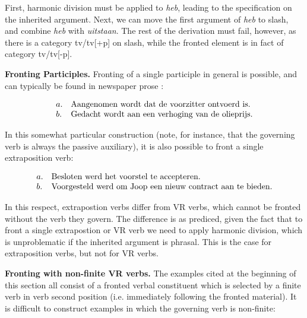 \noindent First, harmonic division must be applied to {\em heb}, leading to the
specification {\sc [+phrase]} on the inherited argument.  Next, we can move the
first argument of {\em heb} to {\sc slash}, and combine {\em heb} with {\em
uitstaan}.  The rest of the derivation must fail, however, as there is a
category {\sc tv/tv[+p]} on {\sc slash}, while the fronted element is in fact of
category {\sc tv/tv[-p]}.

{\bf Fronting Participles.}
Fronting of a single participle in general is possible, and can typically 
be found in newspaper prose \cite{ans}:

\begin{equation}
\begin{array}[t]{ll@{\hspace{0cm}}l}
a. && \mbox{Aangenomen wordt dat de voorzitter ontvoerd is.} \\
b. && \mbox{Gedacht wordt aan een verhoging van de olieprijs.} \\
\end{array} 
\end{equation}

\noindent In this somewhat particular construction (note, for instance, that the 
governing verb is always the passive auxiliary), it is also possible to front a 
single extraposition verb:

\begin{equation}
\begin{array}[t]{ll@{\hspace{0cm}}l}
a. && \mbox{Besloten werd het voorstel te accepteren.} \\
b. && \mbox{Voorgesteld werd om Joop een nieuw contract aan te bieden.} \\
\end{array} 
\end{equation}

\noindent In this respect, extrapostion verbs differ from VR verbs, which cannot 
be fronted without the verb they govern. The difference is as prediced, given 
the fact that to front a single extrapostion or VR verb we need to apply 
harmonic division, which is unproblematic if the inherited argument is phrasal. 
This is the case for extraposition verbs, but not for VR verbs.

{\bf Fronting with non-finite VR verbs.} The examples cited at the beginning of 
this section all consist of a fronted verbal constituent which is selected by a 
finite verb in verb second position (i.e. immediately following the fronted 
material). It is difficult to construct examples in which the governing verb is 
non-finite:

